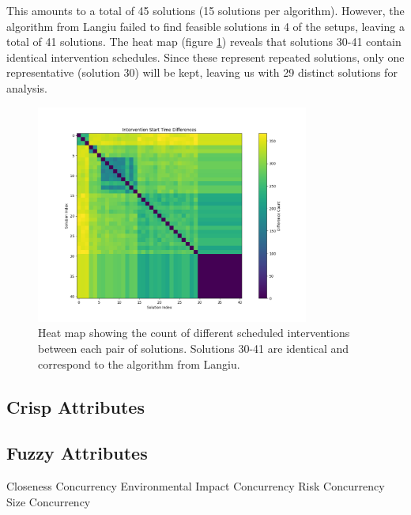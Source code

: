 This amounts to a total of 45 solutions (15 solutions per algorithm). However, the algorithm from Langiu failed to find feasible solutions in 4 of the setups, leaving a total of 41 solutions. The heat map (figure \ref{fig:dif_sol}) reveals that solutions 30-41 contain identical intervention schedules. Since these represent repeated solutions, only one representative (solution 30) will be kept, leaving us with 29 distinct solutions for analysis.

\begin{figure}[ht]
    \centering
    \includegraphics[width=0.8\textwidth]{ch3/figures/diff_sol.png}
    \caption{Heat map showing the count of different scheduled interventions between each pair of solutions. Solutions 30-41 are identical and correspond to the algorithm from Langiu.}
    \label{fig:dif_sol}
\end{figure}









\subsection{Crisp Attributes}



\subsection{Fuzzy Attributes}
Closeness Concurrency
Environmental Impact Concurrency
Risk Concurrency %
Size Concurrency %
